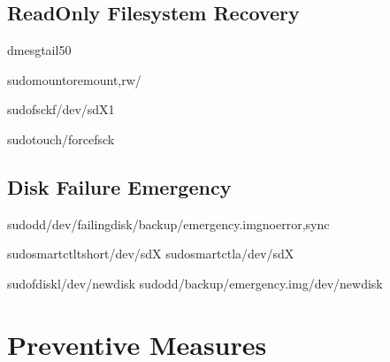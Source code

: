 \documentclass[letterpaper,10pt,english]{sphinxmanual}
\begin{document}
\subsection{Read\sphinxhyphen{}Only Filesystem Recovery}
\label{\detokenize{troubleshooting:read-only-filesystem-recovery}}
\begin{sphinxVerbatim}[commandchars=\\\{\}]
dmesgtail\PYGZhy{}50

sudomount\PYGZhy{}oremount,rw/

sudofsck\PYGZhy{}f/dev/sdX1

sudotouch/forcefsck
\end{sphinxVerbatim}


\subsection{Disk Failure Emergency}
\label{\detokenize{troubleshooting:disk-failure-emergency}}
\begin{sphinxVerbatim}[commandchars=\\\{\}]
sudodd/dev/failing\PYGZus{}disk/backup/emergency.imgnoerror,sync

sudosmartctl\PYGZhy{}tshort/dev/sdX
sudosmartctl\PYGZhy{}a/dev/sdX

sudofdisk\PYGZhy{}l/dev/new\PYGZus{}disk
sudodd/backup/emergency.img/dev/new\PYGZus{}disk
\end{sphinxVerbatim}


\section{Preventive Measures}
\label{\detokenize{troubleshooting:preventive-measures}}
\end{document}
